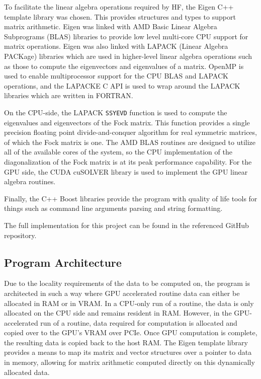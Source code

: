 \documentclass[conference, twoside]{IEEEtran}
\begin{document}
To facilitate the linear algebra operations required by HF, the Eigen \cite{eigen} C++ template library was chosen. This provides structures and types to support matrix arithmetic. Eigen was linked with AMD Basic Linear Algebra Subprograms (BLAS) libraries \cite{amd-blas} to provide low level multi-core CPU support for matrix operations. Eigen was also linked with LAPACK (Linear Algebra PACKage) \cite{lapack} libraries which are used in higher-level linear algebra operations such as those to compute the eigenvectors and eigenvalues of a matrix. OpenMP is used to enable multiprocessor support for the CPU BLAS and LAPACK operations, and the LAPACKE C API is used to wrap around the LAPACK libraries which are written in FORTRAN.

On the CPU-side, the LAPACK \texttt{SSYEVD} function is used to compute the eigenvalues and eigenvectors of the Fock matrix. This function provides a single precision floating point divide-and-conquer algorithm for real symmetric matrices, of which the Fock matrix is one. The AMD BLAS routines are designed to utilize all of the available cores of the system, so the CPU implementation of the diagonalization of the Fock matrix is at its peak performance capability. For the GPU side, the CUDA cuSOLVER library is used to implement the GPU linear algebra routines.

Finally, the C++ Boost libraries provide the program with quality of life tools for things such as command line arguments parsing and string formatting.

The full implementation for this project can be found in the referenced GitHub repository\cite{code-repo}.

\subsection{Program Architecture} %

Due to the locality requirements of the data to be computed on, the program is architected in such a way where GPU accelerated routine data can either be allocated in RAM or in VRAM. In a CPU-only run of a routine, the data is only allocated on the CPU side and remains resident in RAM. However, in the GPU-accelerated run of a routine, data required for computation is allocated and copied over to the GPU's VRAM over PCIe. Once GPU computation is complete, the resulting data is copied back to the host RAM. The Eigen template library provides a means to map its matrix and vector structures over a pointer to data in memory, allowing for matrix arithmetic computed directly on this dynamically allocated data.
\end{document}
